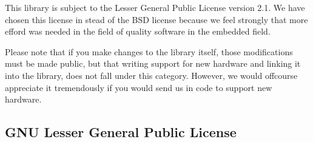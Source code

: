 This library is subject to the Lesser General Public License version 2.1.
We have chosen this license in stead of the BSD license because we feel strongly
that more efford was needed in the field of quality software in the embedded field.

Please note that if you make changes to the library itself, those modifications must be
made public, but that writing support for new hardware and linking it into the library,
does not fall under this category. However, we would offcourse appreciate it tremendously
if you would send us in code to support new hardware.

\subsection{GNU Lesser General Public License}


